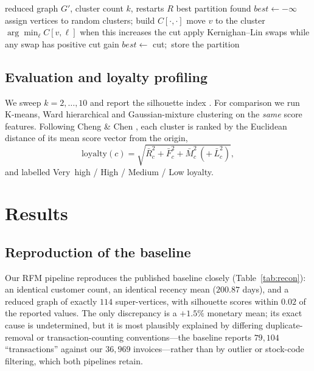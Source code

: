 \documentclass[pdflatex,sn-mathphys-num]{sn-jnl}%
\begin{document}
\begin{algorithm}[h]
\caption{Multi-start local search with Kernighan--Lin for max-$k$-cut}\label{algo:ls}
\begin{algorithmic}[1]
\Require reduced graph $G'$, cluster count $k$, restarts $R$
\Ensure best partition found
\State $best \gets -\infty$
  \State assign vertices to random clusters; build $C[\cdot,\cdot]$
  \Repeat
        \State move $v$ to the cluster $\arg\min_\ell C[v,\ell]$ when this increases the cut
    \EndFor
    \State apply Kernighan--Lin swaps while any swap has positive cut gain
      \State $best \gets$ cut;\ store the partition
  \EndIf
\EndFor
\end{algorithmic}
\end{algorithm}

\subsection{Evaluation and loyalty profiling}\label{subsec:eval}
We sweep $k=2,\dots,10$ and report the silhouette index \cite{rousseeuw1987}. For comparison we run K-means, Ward hierarchical and Gaussian-mixture clustering on the \emph{same} score features. Following Cheng \& Chen \cite{chengchen2009}, each cluster is ranked by the Euclidean distance of its mean score vector from the origin,
\begin{equation}
\mathrm{loyalty}(c)=\sqrt{\bar{R}_c^{2}+\bar{F}_c^{2}+\bar{M}_c^{2}\,(+\,\bar{L}_c^{2})},\label{eq:loyalty}
\end{equation}
and labelled Very~high / High / Medium / Low loyalty.

\section{Results}\label{sec:results}

\subsection{Reproduction of the baseline}\label{subsec:repro}
Our RFM pipeline reproduces the published baseline closely (Table~\ref{tab:recon}): an identical customer count, an identical recency mean ($200.87$ days), and a reduced graph of exactly $114$ super-vertices, with silhouette scores within $0.02$ of the reported values. The only discrepancy is a $+1.5\%$ monetary mean; its exact cause is undetermined, but it is most plausibly explained by differing duplicate-removal or transaction-counting conventions---the baseline reports $79{,}104$ ``transactions'' against our $36{,}969$ invoices---rather than by outlier or stock-code filtering, which both pipelines retain.
\end{document}
